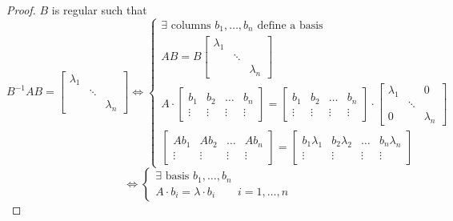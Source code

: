 \documentclass{article}
\numberwithin{lecref}{section}
\begin{document}
\begin{proof}
  $B$ is regular such that
  \[
    B^{-1} AB = \begin{bmatrix} \lambda_1 & & \\ & \ddots & \\ & & \lambda_n \end{bmatrix}
    \iff \begin{cases}
      \exists \text{ columns } b_{1}, \dots, b_n \text{ define a basis} \\
      AB = B \begin{bmatrix} \lambda_1 & & \\ & \ddots & \\ & & \lambda_n \end{bmatrix} \\
      A \cdot \begin{bmatrix} b_1 & b_2 & \dots & b_n \\ \vdots & \vdots & \vdots & \vdots \end{bmatrix} = \begin{bmatrix} b_1 & b_2 & \dots & b_n \\ \vdots & \vdots & \vdots & \vdots \end{bmatrix} \cdot \begin{bmatrix} \lambda_1 &  & 0 \\ & \ddots & \\ 0 & & \lambda_n \end{bmatrix} \\
      \begin{bmatrix} Ab_1 & Ab_2 & \dots & Ab_n \\ \vdots & \vdots & \vdots & \vdots \end{bmatrix} = \begin{bmatrix} b_1 \lambda_1 & b_2 \lambda_2 & \dots & b_n \lambda_n \\ \vdots & \vdots & \vdots & \vdots \end{bmatrix}
    \end{cases}
  \] \[
    \iff \begin{cases}
      \exists \text{ basis } b_1, \dots, b_n \\
      A \cdot b_i = \lambda \cdot b_i \qquad i = 1, \dots, n
    \end{cases}
  \]
\end{proof}
\end{document}
